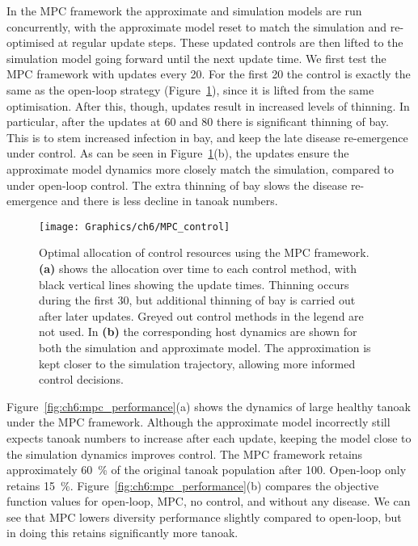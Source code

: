 In the MPC framework the approximate and simulation models are run concurrently, with the approximate model reset to match the simulation and re-optimised at regular update steps. These updated controls are then lifted to the simulation model going forward until the next update time. We first test the MPC framework with updates every \SI{20}{\years}. For the first \SI{20}{\years} the control is exactly the same as the open-loop strategy (Figure~\ref{fig:ch6:mpc_strat}), since it is lifted from the same optimisation. After this, though, updates result in increased levels of thinning. In particular, after the updates at 60 and \SI{80}{\years} there is significant thinning of bay. This is to stem increased infection in bay, and keep the late disease re-emergence under control. As can be seen in Figure~\ref{fig:ch6:mpc_strat}(b), the updates ensure the approximate model dynamics more closely match the simulation, compared to under open-loop control. The extra thinning of bay slows the disease re-emergence and there is less decline in tanoak numbers.

\begin{figure}[!t]
    \begin{center}
        \texttt{[image: Graphics/ch6/MPC\_control]}
        \caption[MPC control strategy]{Optimal allocation of control resources using the MPC framework. \textbf{(a)} shows the allocation over time to each control method, with black vertical lines showing the update times. Thinning occurs during the first \SI{30}{\years}, but additional thinning of bay is carried out after later updates. Greyed out control methods in the legend are not used. In \textbf{(b)} the corresponding host dynamics are shown for both the simulation and approximate model. The approximation is kept closer to the simulation trajectory, allowing more informed control decisions.\label{fig:ch6:mpc_strat}}
    \end{center}
\end{figure}

Figure~\ref{fig:ch6:mpc_performance}(a) shows the dynamics of large healthy tanoak under the MPC framework. Although the approximate model incorrectly still expects tanoak numbers to increase after each update, keeping the model close to the simulation dynamics improves control. The MPC framework retains approximately \SI{60}{\percent} of the original tanoak population after \SI{100}{\years}. Open-loop only retains \SI{15}{\percent}. Figure~\ref{fig:ch6:mpc_performance}(b) compares the objective function values for open-loop, MPC, no control, and without any disease. We can see that MPC lowers diversity performance slightly compared to open-loop, but in doing this retains significantly more tanoak.

